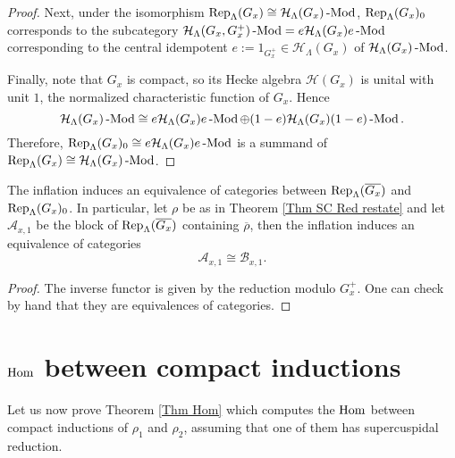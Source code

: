 \begin{proof}
			
			Next, under the isomorphism $\operatorname{\operatorname{Rep}}_{\Lambda}(G_x) \cong \mathcal{H}_{\Lambda}(G_x)\operatorname{-Mod}$, $\operatorname{\operatorname{Rep}}_{\Lambda}(G_x)_0$ corresponds to the subcategory  $\mathcal{H}_{\Lambda}(G_x, G_x^+)\operatorname{-Mod}=e\mathcal{H}_{\Lambda}(G_x)e\operatorname{-Mod}$ corresponding to the central idempotent $e:=1_{G_x^+} \in \mathcal{H}_{\Lambda}(G_x)$ of $\mathcal{H}_{\Lambda}(G_x)\operatorname{-Mod}$. 
			
			Finally, note that $G_x$ is compact, so its Hecke algebra $\mathcal{H}(G_x)$ is unital with unit $1$, the normalized characteristic function of $G_x$. Hence
			$$\mathcal{H}_{\Lambda}(G_x)\operatorname{-Mod} \cong e\mathcal{H}_{\Lambda}(G_x)e\operatorname{-Mod} \oplus (1-e)\mathcal{H}_{\Lambda}(G_x)(1-e)\operatorname{-Mod}.$$
			Therefore, $\operatorname{\operatorname{Rep}}_{\Lambda}(G_x)_0 \cong e\mathcal{H}_{\Lambda}(G_x)e\operatorname{-Mod}$ is a summand of $\operatorname{\operatorname{Rep}}_{\Lambda}(G_x) \cong \mathcal{H}_{\Lambda}(G_x)\operatorname{-Mod}$. 
		\end{proof}
		
		\begin{lemma}\label{Lemma A to B}
			The inflation induces an equivalence of categories between $\operatorname{\operatorname{Rep}}_{\Lambda}(\overline{G_x})$ and $\operatorname{\operatorname{Rep}}_{\Lambda}(G_x)_0$. In particular, let $\rho$ be as in Theorem \ref{Thm SC Red restate} and let $\mathcal{A}_{x,1}$ be the block of $\operatorname{\operatorname{Rep}}_{\Lambda}(\overline{G_x})$ containing $\overline{\rho}$, then the inflation induces an equivalence of categories 
			$$\mathcal{A}_{x,1} \cong \mathcal{B}_{x,1}.$$
		\end{lemma}
		
		\begin{proof}
			The inverse functor is given by the reduction modulo $G_x^+$. One can check by hand that they are equivalences of categories.
		\end{proof}
		
		
		
		
		
		
		
		
		
		
		\section{$\operatorname{\operatorname{Hom}}$ between compact inductions}\label{Sec Pf Thm Hom}
		
		Let us now prove Theorem \ref{Thm Hom} which computes the $\operatorname{\operatorname{Hom}}$ between compact inductions of $\rho_1$ and $\rho_2$, assuming that one of them has supercuspidal reduction.
		
